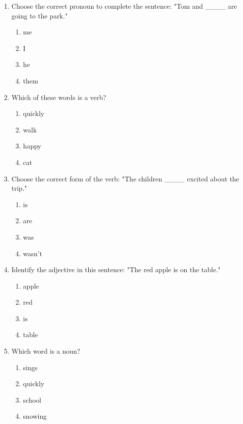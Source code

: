 \documentclass[12pt]{article}
\begin{document}
\begin{enumerate}
    \item Choose the correct pronoun to complete the sentence:  
    "Tom and \_\_\_\_ are going to the park."  
    \begin{enumerate}[label=\Alph*.]
        \item me
        \item I
        \item he
        \item them
    \end{enumerate}
    \vspace{0.5cm}

    \item Which of these words is a verb?  
    \begin{enumerate}[label=\Alph*.]
        \item quickly
        \item walk
        \item happy
        \item cat
    \end{enumerate}
    \vspace{0.5cm}

    \item Choose the correct form of the verb:  
    "The children \_\_\_\_ excited about the trip."  
    \begin{enumerate}[label=\Alph*.]
        \item is
        \item are
        \item was
        \item wasn't
    \end{enumerate}
    \vspace{0.5cm}

    \item Identify the adjective in this sentence: "The red apple is on the table."  
    \begin{enumerate}[label=\Alph*.]
        \item apple
        \item red
        \item is
        \item table
    \end{enumerate}
    \vspace{0.5cm}

    \item Which word is a noun?  
    \begin{enumerate}[label=\Alph*.]
        \item sings
        \item quickly
        \item school
        \item snowing
    \end{enumerate}
    \vspace{0.5cm}


\end{enumerate}
\end{document}
